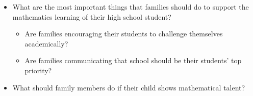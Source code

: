 {{\begin{itemize}
        \item What are the most important things that families should do to support the mathematics learning of their high school student?
          \begin{itemize}
            \item Are families encouraging their students to challenge themselves academically?
            
            \item Are families communicating that school should be their students' top priority?
          \end{itemize}\vspace{\baselineskip}

        \item What should family members do if their child shows mathematical talent?
      \end{itemize}}
  }
